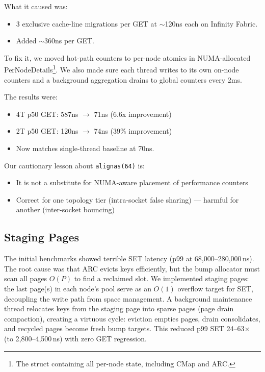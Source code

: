 \documentclass[sigplan,10pt]{acmart}
\begin{document}
What it caused was:
\begin{itemize}
  \item 3 exclusive cache-line migrations per GET at $\sim$120ns each on Infinity Fabric.
  \item Added $\sim$360ns per GET.
\end{itemize}

To fix it, we moved hot-path counters to per-node atomics in NUMA-allocated PerNodeDetails\footnote{The struct containing all per-node state, including CMap and ARC.}.
We also made sure each thread writes to its own on-node counters and a background aggregation drains to global counters every 2ms.

The results were:
\begin{itemize}
  \item 4T p50 GET: 587ns $\rightarrow$ 71ns (6.6x improvement)
  \item 2T p50 GET: 120ns $\rightarrow$ 74ns (39\% improvement)
  \item Now matches single-thread baseline at 70ns.
\end{itemize}

Our cautionary lesson about \texttt{alignas(64)} is:
\begin{itemize}
  \item It is not a substitute for NUMA-aware placement of performance counters
  \item Correct for one topology tier (intra-socket false sharing) --- harmful for another (inter-socket bouncing)
\end{itemize}
\subsection{Staging Pages}

%
The initial benchmarks showed terrible SET latency (p99 at 68,000--280,000\,ns).
The root cause was that ARC evicts keys efficiently, but the bump allocator must scan all pages $O(P)$ to find a reclaimed slot.
We implemented staging pages: the last page(s) in each node's pool serve as an $O(1)$ overflow target for SET, decoupling the write path from space management.
A background maintenance thread relocates keys from the staging page into sparse pages (page drain compaction), creating a virtuous cycle: eviction empties pages, drain consolidates, and recycled pages become fresh bump targets.
This reduced p99 SET 24--63$\times$ (to 2,800--4,500\,ns) with zero GET regression.
\end{document}
